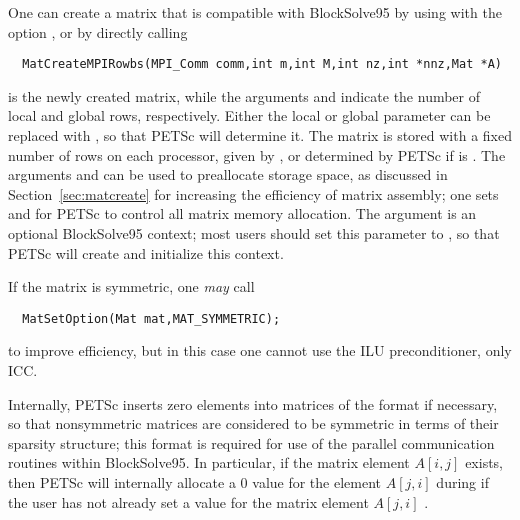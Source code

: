 One can create a matrix that is compatible with BlockSolve95 by using
 with the option , or by directly
calling 
\begin{verbatim}
  MatCreateMPIRowbs(MPI_Comm comm,int m,int M,int nz,int *nnz,Mat *A)
\end{verbatim}
 is the newly created matrix, while the arguments  and
 indicate the number of local and global rows,
respectively. Either the local or global parameter can be replaced
with , so that PETSc will determine it.  The matrix
is stored with a fixed number of rows on each processor, given by , or determined by PETSc if  is .  The
arguments  and  can be used to preallocate storage
space, as discussed in Section~\ref{sec:matcreate} for increasing
the efficiency of matrix assembly; one sets  and
 for PETSc to control all matrix memory
allocation.  The argument  is an optional BlockSolve95
 context; most users should set this parameter to 
, so that PETSc will create and initialize this context.

If the matrix is symmetric, one {\em may} call
\begin{verbatim}
  MatSetOption(Mat mat,MAT_SYMMETRIC);
\end{verbatim}
to improve efficiency, but in this case one cannot use the ILU 
preconditioner, only ICC.

Internally, PETSc inserts zero elements into matrices of the  format if necessary, so that nonsymmetric matrices are
considered to be symmetric in terms of their sparsity structure; this
format is required for use of the parallel communication routines
within BlockSolve95. In particular, if the matrix element $A[i,j]$
exists, then PETSc will internally allocate a 0 value for the element
$ A[j,i] $ during  if the user has not already set
a value for the matrix element $ A[j,i] $ .

